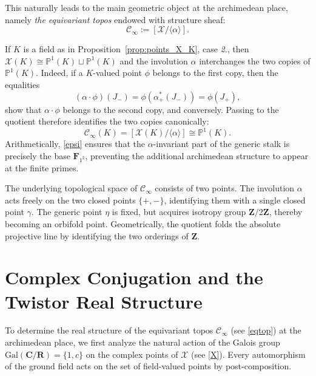 \documentclass[11pt,a4paper]{article}
\let\mathscr\mathscr
\newcommand{\C}{\mathbf{C}}
\renewcommand{\P}{\mathbb{P}}
\newcommand{\R}{\mathbf{R}}
\newcommand{\Z}{\mathbf{Z}}
\newcommand{\Ftwo}{\mathbf{F}_{1^2}}
\newcommand{\minf}{\mathscr C_\infty}
\newcommand{\Gal}{\mathrm{Gal}}
\begin{document}
This naturally leads to the main geometric object at the
archimedean place, namely  \emph{the equivariant topos} endowed with structure sheaf:
\begin{equation}\label{eqtop}
\minf:=[\mathcal X/\langle\alpha\rangle].
\end{equation}

If $K$ is a field as in 
Proposition~\ref{prop:points_X_K}, case \emph{2}., then $\mathcal X(K)\cong \P^1(K)\sqcup\P^1(K)$ and  the involution $\alpha$
interchanges the two copies of $\P^1(K)$.
Indeed, if a $K$-valued point $\phi$ belongs to the first copy, then the equalities
\[
(\alpha\cdot\phi)(J_-)
=
\phi(\alpha_+^*(J_-))
=
\phi(J_+),
\]
show that  $\alpha\cdot\phi$ belongs to the second copy, and conversely.
Passing to the quotient therefore identifies the two copies canonically:
\[
\minf(K)
=
[\mathcal X(K)/\langle\alpha\rangle]
\cong
\P^1(K).
\]
 Arithmetically,
\eqref{epsi} ensures that the $\alpha$-invariant part of the generic stalk is precisely
the base $\Ftwo$, preventing the additional archimedean structure to
appear at the finite primes.\vspace{.03in}






The underlying topological space of 
$
\minf
$
consists of  two points. The involution $\alpha$ acts freely on the two
closed points $\{+,-\}$, identifying them with a single closed point $\gamma$. The
generic point $\eta$ is fixed, but acquires isotropy group $\Z/2\Z$, thereby
becoming an orbifold point. Geometrically, the quotient folds the absolute
projective line by identifying the two orderings of $\Z$.




\section{Complex Conjugation and the Twistor Real Structure}

To determine the real structure of the equivariant topos
$\minf$ (see \eqref{eqtop}) at the archimedean place, we first analyze the natural
action of the Galois group
$
\Gal(\C/\R)=\{1,c\}
$
on the complex points of $\mathcal X$ (see \eqref{X}). Every automorphism of the
ground field acts on the set of field-valued points by post-composition.
\end{document}

